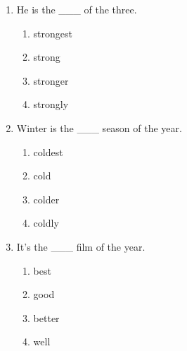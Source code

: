 \documentclass[11pt,a4paper]{ctexart}
\begin{document}
\begin{enumerate}[leftmargin=*,itemsep=4pt]
\begin{enumerate}[label=\Alph*.,leftmargin=2em,itemsep=1pt,topsep=2pt]
\item interesting
\item interestingly
\end{enumerate}
\item He is the \_\_\_ of the three.
\begin{enumerate}[label=\Alph*.,leftmargin=2em,itemsep=1pt,topsep=2pt]
\item strongest
\item strong
\item stronger
\item strongly
\end{enumerate}
\item Winter is the \_\_\_ season of the year.
\begin{enumerate}[label=\Alph*.,leftmargin=2em,itemsep=1pt,topsep=2pt]
\item coldest
\item cold
\item colder
\item coldly
\end{enumerate}
\item It’s the \_\_\_ film of the year.
\begin{enumerate}[label=\Alph*.,leftmargin=2em,itemsep=1pt,topsep=2pt]
\item best
\item good
\item better
\item well
\end{enumerate}
\end{enumerate}
\end{document}
